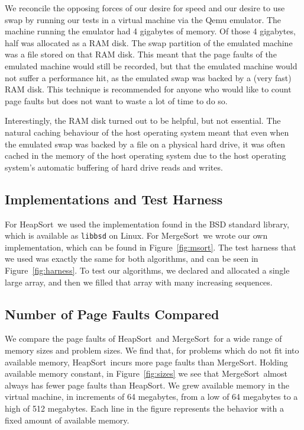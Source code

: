 \documentclass{acmtrans2m}
\newcommand{\heapsort}{{\sc HeapSort}}
\newcommand{\mergesort}{{\sc MergeSort}}
\begin{document}
We reconcile the opposing forces of our desire for speed and our desire to use
swap by running our tests in a virtual machine via the Qemu emulator.  The
machine running the emulator had 4 gigabytes of memory.  Of those 4 gigabytes,
half was allocated as a RAM disk.  The swap partition of the emulated machine
was a file stored on that RAM disk.  This meant that the page faults of the
emulated machine would still be recorded, but that the emulated machine would
not suffer a performance hit, as the emulated swap was backed by a (very fast)
RAM disk.  This technique is recommended for anyone who would like to count
page faults but does not want to waste a lot of time to do so.

Interestingly, the RAM disk turned out to be helpful, but not essential. The
natural caching behaviour of the host operating system meant that even when the
emulated swap was backed by a file on a physical hard drive, it was often
cached in the memory of the host operating system due to the host operating
system's automatic buffering of hard drive reads and writes.

\subsection{Implementations and Test Harness}

For \heapsort\ we used the implementation found in the BSD standard library,
which is available as {\tt libbsd} on Linux.  For \mergesort\ we wrote our own
implementation, which can be found in Figure~\ref{fig:msort}.  The test harness
that we used was exactly the same for both algorithms, and can be seen in
Figure~\ref{fig:harness}.  To test our algorithms, we declared and allocated a
single large array, and then we filled that array with many increasing
sequences.


\subsection{Number of Page Faults Compared}

We compare the page faults of \heapsort\ and \mergesort\ for a wide range of memory sizes and problem sizes.  We find that, for problems which do not fit into available memory, \heapsort\ incurs more page faults than \mergesort.  Holding available memory constant, in Figure~\ref{fig:sizes} we see that \mergesort\ almost always has fewer page faults than \heapsort.  We grew available memory in the virtual machine, in increments of 64 megabytes, from a low of 64 megabytes to a high of 512 megabytes.  Each line in the figure represents the behavior with a fixed amount of available memory.
\end{document}
